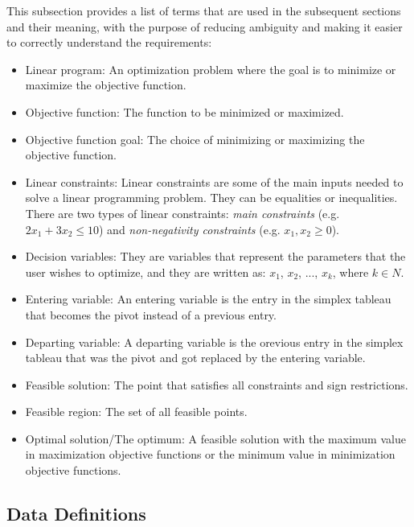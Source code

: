 \documentclass[12pt]{article}
\begin{document}
This subsection provides a list of terms that are used in the subsequent
sections and their meaning, with the purpose of reducing ambiguity and making it
easier to correctly understand the requirements:

\begin{itemize}
	\item Linear program: An optimization problem where the goal is to minimize 
	or maximize the objective function.
	
	\item Objective function: The function to be minimized or maximized.
	
	\item Objective function goal: The choice of minimizing or maximizing the 
	objective function.
	
	\item Linear constraints: Linear constraints are some of the main inputs 
	needed to solve a linear programming problem. They can be equalities or 
	inequalities. There are two types of linear constraints: \textit{main 
	constraints} (e.g. $2x_1 + 3x_2 \leq 10$) and \textit{non-negativity 
	constraints} (e.g. $x_1, x_2 \geq 0$).
	
	\item Decision variables: They are variables that represent the parameters 
	that the user wishes to optimize, and they are written as: ${x_1}$, 
	${x_2}$, ..., ${x_k}$, where $k \in N$.
	
	\item Entering variable: An entering variable is the entry in the simplex 
	tableau that becomes the pivot instead of a previous entry.
	
	\item Departing variable: A departing variable is the orevious entry in the 
	simplex tableau that was the pivot and got replaced by the entering 
	variable.
	
	\item Feasible solution: The point that satisfies all constraints and sign 
	restrictions.
	
	\item Feasible region: The set of all feasible points.
	
	\item Optimal solution/The optimum: A feasible solution with the maximum 
	value in maximization objective functions or the minimum value in 
	minimization objective functions.
\end{itemize}

\subsection{Data Definitions} \label{sec_datadef}
\end{document}
